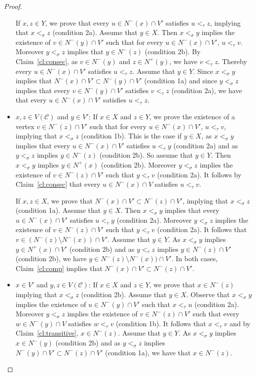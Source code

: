 \begin{proof}
\begin{proofclaim}
\begin{itemize}
If $x,z\in Y$, we prove that every $u\in N^-(x)\cap V'$ satisfies $u<_{\tau} z$, implying that $x<_{\sigma} z$ (condition 2a). Assume that $y\in X$. Then $x <_{\sigma} y$ implies the existence of $v\in N^-(y)\cap V'$ such that for every $u\in N^-(x)\cap V'$, $u<_{\tau} v$. Moreover $y<_{\sigma} z$ implies that $y\in N^-(z)$ (condition 2b). By Claim~\ref{cl:consec}, as $v\in N^-(y)$ and $z\in N^+(y)$, we have $v<_{\tau} z$. Thereby every $u\in N^-(x)\cap V'$ satisfies $u<_{\tau} z$. Assume that $y\in Y$. Since $x<_{\sigma} y$ implies that $N^-(x)\cap V'\subset N^-(y)\cap V'$ (condition 1a) and since $y<_{\sigma} z$ implies that every $v\in N^-(y)\cap V'$ satisfies $v<_{\tau} z$ (condition 2a), we have that every $u\in N^-(x)\cap V'$ satisfies $u<_{\tau} z$. 



\item $x,z\in V(\mathcal{C})$ and $y\in V'$: If  $x\in X$ and $z\in Y$, we prove the existence of a vertex $v\in N^-(z)\cap V'$ such that for every $u\in N^-(x)\cap V'$, $u<_{\tau} v$, implying that $x<_{\sigma} z$ (condition 1b). This is the case if $y\in X$, as $x<_{\sigma} y$ implies that every $u\in N^-(x)\cap V'$ satisfies $u<_{\tau} y$ (condition 2a) and as $y<_{\sigma} z$ implies $y\in N^-(z)$ (condition 2b). So assume that $y\in Y$. Then $x<_{\sigma} y$ implies $y\in N^+(x)$ (condition 2b). Moreover $y<_{\sigma} z$ implies the existence of $v\in N^-(z)\cap V'$ such that $y<_{\tau} v$ (condition 2a). It follows by Claim~\ref{cl:consec} that every $u\in N^-(x)\cap V$ satisfies $u<_{\tau} v$.

If  $x,z\in X$, we prove that $N^-(x)\cap V'\subset N^-(z)\cap V'$, implying that $x<_{\sigma} z$ (condition 1a). Assume that $y\in X$. Then  $x<_{\sigma} y$ implies that every $u\in N^-(x)\cap V'$ satisfies $u<_{\tau} y$ (condition 2a). Moreover $y<_{\sigma} z$ implies the existence of $v\in N^-(z)\cap V'$ such that $y<_{\tau} v$ (condition 2a). It follows that $v\in (N^-(z)\setminus N^-(x))\cap V'$. Assume that $y\in Y$. As $x<_{\sigma} y$ implies $y\in N^+(x)\cap V'$ (condition 2b) and as $y<_{\tau} z$ implies $y\in N^-(z)\cap V'$ (condition 2b), we have $y\in N^-(z)\setminus N^-(x))\cap V'$. In both cases, Claim~\ref{cl:comp} implies that $N^-(x)\cap V'\subset N^-(z)\cap V'$.


\item $x\in V'$ and $y,z\in V(\mathcal{C})$: If  $x\in X$ and $z\in Y$, we prove that $x\in N^-(z)$ implying that $x<_{\sigma} z$ (condition 2b). Assume that $y\in X$. Observe that $x<_{\sigma} y$ implies the existence of $u\in N^-(y)\cap V'$ such that $x<_{\tau} u$ (condition 2a). Moreover $y<_{\sigma} z$ implies the existence of $v\in N^-(z)\cap V'$ such that every $w\in N^-(y)\cap V$ satisfies $w<_{\tau} v$ (condition 1b). It follows that $x<_{\tau} v$ and by Claim~\ref{cl:transitive}, $x\in N^-(z)$. Assume that $y\in Y$. As $x<_{\sigma} y$ implies $x\in N^-(y)$ (condition 2b) and as $y<_{\sigma} z$ implies $N^-(y)\cap V'\subset N^-(z)\cap V'$ (condition 1a), we have that $x\in N^-(z)$.



\end{itemize}
\end{proofclaim}
\end{proof}
